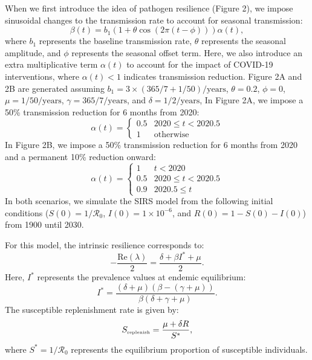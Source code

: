 \documentclass[12pt]{article}
\newcommand{\tsub}[2]{#1_{{\textrm{\tiny #2}}}}
\begin{document}
When we first introduce the idea of pathogen resilience (Figure 2), we impose sinusoidal changes to the transmission rate to account for seasonal transmission:
\begin{equation}
\beta(t) = b_1 (1 + \theta \cos(2 \pi (t-\phi))) \alpha(t),
\end{equation}
where $b_1$ represents the baseline transmission rate, $\theta$ represents the seasonal amplitude, and $\phi$ represents the seasonal offset term.
Here, we also introduce an extra multiplicative term $\alpha(t)$ to account for the impact of COVID-19 interventions, where $\alpha(t) < 1$ indicates transmission reduction.
Figure 2A and 2B are generated assuming $b_1 = 3 \times (365/7+1/50)/\mathrm{years}$, $\theta=0.2$, $\phi=0$, $\mu=1/50/\mathrm{years}$, $\gamma=365/7/\mathrm{years}$, and $\delta=1/2/\mathrm{years}$,
In Figure 2A, we impose a 50\% transmission reduction for 6 months from 2020:
\begin{equation}
\alpha(t) = \begin{cases}
0.5 & 2020 \leq t< 2020.5\\
1 & \textrm{otherwise}
\end{cases}
\end{equation}
In Figure 2B, we impose a 50\% transmission reduction for 6 months from 2020 and a permanent 10\% reduction onward:
\begin{equation}
\alpha(t) = \begin{cases}
1 & t < 2020\\
0.5 & 2020 \leq t < 2020.5\\
0.9 & 2020.5 \leq t
\end{cases}
\end{equation}
In both scenarios, we simulate the SIRS model from the following initial conditions ($S(0) = 1/\mathcal R_0$, $I(0) = 1\times 10^{-6}$, and $R(0) = 1 - S(0) - I(0)$) from 1900 until 2030.

For this model, the intrinsic resilience corresponds to:
\begin{equation}
-\frac{\mathrm{Re}(\lambda)}{2} = \frac{\delta + \beta I^{\ast} + \mu}{2}.
\end{equation}
Here, $I^{\ast}$ represents the prevalence values at endemic equilibrium:
\begin{equation}
I^{\ast} = \frac{(\delta + \mu)(\beta - (\gamma + \mu))}{\beta(\delta + \gamma + \mu)}.
\end{equation}
The susceptible replenishment rate is given by:
\begin{equation}
\tsub{S}{replenish} = \frac{\mu + \delta R}{S^\ast},
\end{equation}
where $S^\ast = 1/\mathcal R_0$ represents the equilibrium proportion of susceptible individuals.
\end{document}
